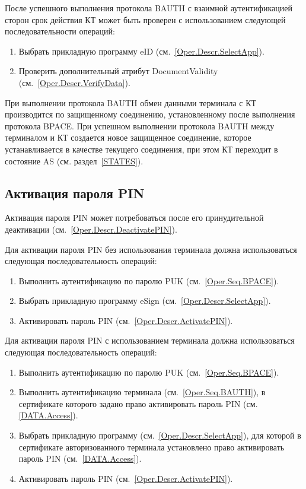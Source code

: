 После успешного выполнения протокола BAUTH 
с взаимной аутентификацией сторон
срок действия КТ может быть проверен с использованием
следующей последовательности операций:
%
\begin{enumerate}
\item Выбрать прикладную программу eID (см.~\ref{Oper.Descr.SelectApp}).
\item Проверить дополнительный атрибут DocumentValidity (см.~\ref{Oper.Descr.VerifyData}).
\end{enumerate}

При выполнении протокола BAUTH обмен данными терминала с КТ производится по 
защищенному соединению, установленному после выполнения протокола BPACE. 
При успешном выполнении протокола BAUTH между терминалом и КТ создается новое 
защищенное соединение, которое устанавливается в качестве текущего
соединения, при этом КТ переходит в состояние AS (см. раздел~\ref{STATES}).

\subsection{Активация пароля PIN}
\label{Oper.Seq.ActivatePIN}

Активация пароля PIN может потребоваться после его
принудительной деактивации (см.~\ref{Oper.Descr.DeactivatePIN}).

Для активации пароля PIN без использования терминала
должна использоваться следующая последовательность операций:
%
\begin{enumerate}
\item Выполнить аутентификацию по паролю PUK (см.~\ref{Oper.Seq.BPACE}).

\item Выбрать прикладную программу eSign (см.~\ref{Oper.Descr.SelectApp}).

\item Активировать пароль PIN (см.~\ref{Oper.Descr.ActivatePIN}).

\end{enumerate}

Для активации пароля PIN с использованием терминала
должна использоваться следующая последовательность операций:

\begin{enumerate}
\item Выполнить аутентификацию по паролю PUK (см.~\ref{Oper.Seq.BPACE}).

\item Выполнить аутентификацию терминала (см.~\ref{Oper.Seq.BAUTH}), 
в сертификате которого задано право активировать пароль PIN (см. \ref{DATA.Access}).

\item Выбрать прикладную программу  (см.~\ref{Oper.Descr.SelectApp}), 
для которой в сертификате авторизованного терминала установлено 
право активировать пароль PIN (см.~\ref{DATA.Access}).

\item Активировать пароль PIN (см.~\ref{Oper.Descr.ActivatePIN}).

\end{enumerate}

